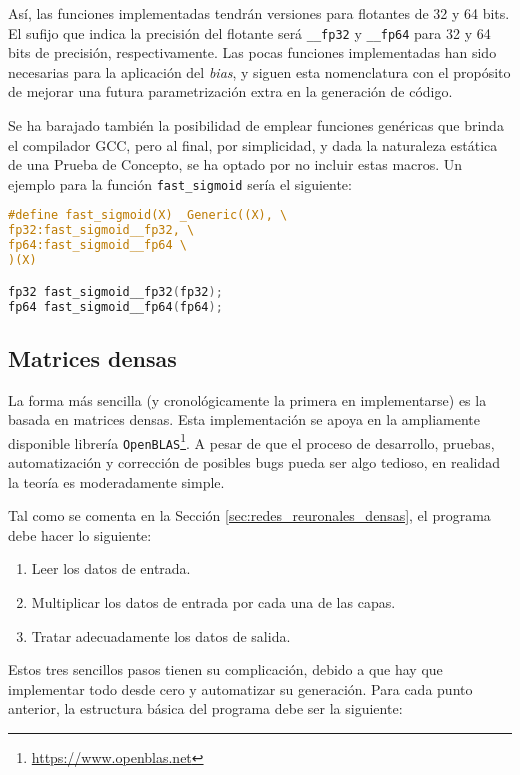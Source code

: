 Así, las funciones implementadas tendrán versiones para flotantes de 32 y 64 bits. El sufijo que indica la precisión del flotante será \texttt{\_\_fp32} y \texttt{\_\_fp64} para 32 y 64 bits de precisión, respectivamente. Las pocas funciones implementadas han sido necesarias para la aplicación del \textit{bias}, y siguen esta nomenclatura con el propósito de mejorar una futura parametrización extra en la generación de código.

Se ha barajado también la posibilidad de emplear funciones genéricas que brinda el compilador GCC, pero al final, por simplicidad, y dada la naturaleza estática de una Prueba de Concepto, se ha optado por no incluir estas macros. Un ejemplo para la función \texttt{fast\_sigmoid} sería el siguiente:\medskip
\begin{lstlisting}[language=C]
#define fast_sigmoid(X) _Generic((X), \
fp32:fast_sigmoid__fp32, \
fp64:fast_sigmoid__fp64 \
)(X)

fp32 fast_sigmoid__fp32(fp32);
fp64 fast_sigmoid__fp64(fp64);
\end{lstlisting}


\subsection{Matrices densas}
\label{ssec:gdin_matrices_densas}
La forma más sencilla (y cronológicamente la primera en implementarse) es la basada en matrices densas. Esta implementación se apoya en la ampliamente disponible librería \texttt{OpenBLAS}\footnote{\url{https://www.openblas.net}}. A pesar de que el proceso de desarrollo, pruebas, automatización y corrección de posibles bugs pueda ser algo tedioso, en realidad la teoría es moderadamente simple.

Tal como se comenta en la Sección \ref{sec:redes_reuronales_densas}, el programa debe hacer lo siguiente:

\begin{enumerate}
    \item Leer los datos de entrada.
    \item Multiplicar los datos de entrada por cada una de las capas.
    \item Tratar adecuadamente los datos de salida.
\end{enumerate}

Estos tres sencillos pasos tienen su complicación, debido a que hay que implementar todo desde cero y automatizar su generación. Para cada punto anterior, la estructura básica del programa debe ser la siguiente:

